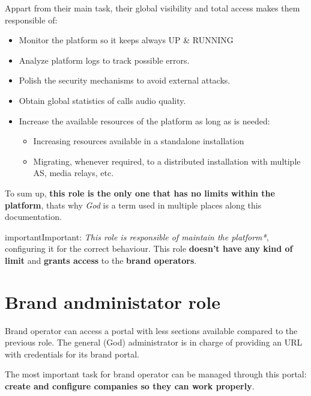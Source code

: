 \documentclass[letterpaper,10pt,english]{sphinxmanual}
\begin{document}
Appart from their main task, their global visibility and total access
makes them responsible of:
\begin{itemize}
\item {} 
Monitor the platform so it keeps always UP \& RUNNING

\item {} 
Analyze platform logs to track possible errors.

\item {} 
Polish the security mechanisms to avoid external attacks.

\item {} 
Obtain global statistics of calls audio quality.

\item {} 
Increase the available resources of the platform as long as is needed:
\begin{itemize}
\item {} 
Increasing resources available in a standalone installation

\item {} 
Migrating, whenever required, to a distributed installation with multiple
AS, media relays, etc.

\end{itemize}

\end{itemize}

To sum up, \textbf{this role is the only one that has no limits within the
platform}, thats why \emph{God} is a term used in multiple places along this
documentation.

\begin{notice}{important}{Important:}
\emph{This role is responsible of maintain the platform*}, configuring
it for the correct behaviour. This role \textbf{doesn't have any kind
of limit} and \textbf{grants access} to the \textbf{brand operators}.
\end{notice}


\section{Brand andministator role}
\label{operation_roles/index:brand-andministator-role}
Brand operator can access a portal with less sections available compared
to the previous role. The general (God) administrator is in charge of
providing an URL with credentials for its brand portal.

The most important task for brand operator can be managed through this
portal: \textbf{create and configure companies so they can work properly}.
\end{document}
